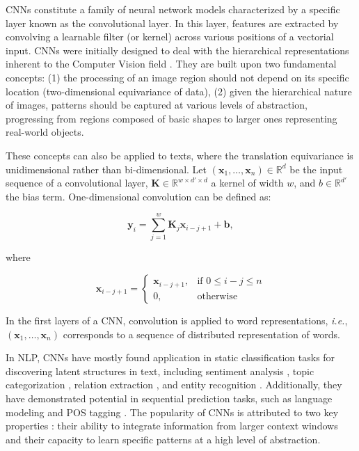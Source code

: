 \acp{CNN} constitute a family of neural network models characterized by a specific layer known as the convolutional layer. In this layer, features are extracted by convolving a learnable filter (or kernel) across various positions of a vectorial input.
\acp{CNN} were initially designed to deal with the hierarchical representations inherent to the Computer Vision field \citep{lecun1989backpropagation}. They are built upon two fundamental concepts: (1) the processing of an image region should not depend on its specific location (two-dimensional equivariance of data), (2) given the hierarchical nature of images, patterns should be captured at various levels of abstraction, progressing from regions composed of basic shapes to larger ones representing real-world objects. 

These concepts can also be applied to texts, where the translation equivariance is unidimensional rather than bi-dimensional. Let $(\bm{x}_1, \ldots, \bm{x}_n) \in \mathbb{R}^d$ be the input sequence of a convolutional layer, $\bm{K} \in \mathbb{R}^{w \times d' \times d}$ a kernel of width $w$, and $b \in \mathbb{R}^{d'}$ the bias term. One-dimensional convolution can be defined as:

\begin{equation}
    \bm{y}_i = \sum_{j=1}^w \bm{K}_j \bm{x}_{i-j+1} + \bm{b},
\end{equation}

\noindent where

\[
    \bm{x}_{i-j+1} = 
        \begin{cases}
            \bm{x}_{i-j+1}, & \text{if } 0 \leq i-j \leq n \\
            0,              & \text{otherwise}
        \end{cases}
\]

In the first layers of a \ac{CNN}, convolution is applied to word representations, \textit{i.e.}, $(\bm{x}_1, \ldots, \bm{x}_n)$ corresponds to a sequence of distributed representation of words. 

In \ac{NLP}, \acp{CNN} have mostly found application in static classification tasks for discovering latent structures in text, including sentiment analysis \citep{kalchbrenner2014convolutional}, topic categorization \citep{kim2014convolutional}, relation extraction \citep{nguyen2015relation}, and entity recognition \citep{adel2016comparing}. Additionally, they have demonstrated potential in sequential prediction tasks, such as language modeling \citep{pham2016convolutional} and \ac{POS} tagging \citep{collobert2011natural}. The popularity of \acp{CNN} is attributed to two key properties \citep{pham2016convolutional}: their ability to integrate information from larger context windows and their capacity to learn specific patterns at a high level of abstraction.

